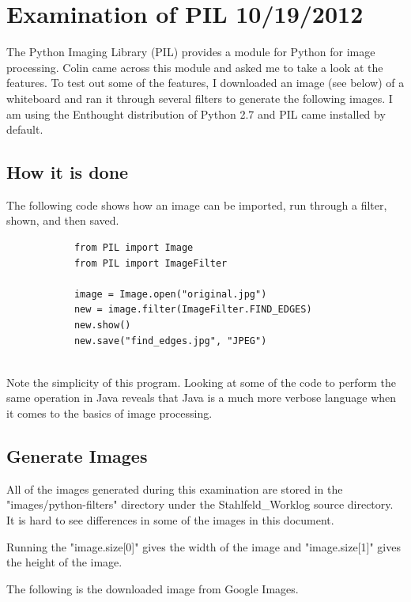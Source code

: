 \documentclass[]{article}
\begin{document}
	
	
	\section{Examination of PIL 10/19/2012}
		The Python Imaging Library (PIL)  provides a module for Python for image processing. Colin came across this module and asked me to take a look at the features. To test out some of the features, I downloaded an image (see below) of a whiteboard and ran it through several filters to generate the following images. I am using the Enthought distribution of Python 2.7 and PIL came installed by default.
	
		
		\subsection{How it is done}
			The following code shows how an image can be imported, run through a filter, shown, and then saved.
			
			\begin{verbatim}
			from PIL import Image
			from PIL import ImageFilter
			
			image = Image.open("original.jpg")
			new = image.filter(ImageFilter.FIND_EDGES)
			new.show()
			new.save("find_edges.jpg", "JPEG")
			
			\end{verbatim}
			
			Note the simplicity of this program. Looking at some of the code to perform the same operation in Java reveals that Java is a much more verbose language when it comes to the basics of image processing.
		
		\subsection{Generate Images}
			All of the images generated during this examination are stored in the "images/python-filters" directory under the Stahlfeld\_Worklog source directory. It is hard to see differences in some of the images in this document.
		
			Running the "image.size[0]" gives the width of the image and "image.size[1]" gives the height of the image.
			
			The following is the downloaded image from Google Images.
			
\end{document}
